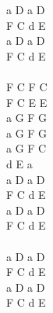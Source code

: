 \documentclass[a5paper, 10pt]{book}
\begin{document}
\begin{minipage}[t]{0.4\textwidth}
a D a D\\
F C d E\\
a D a D\\
F C d E\\
\\
F C F C\\
F C E E\\
a G F G\\
a G F G\\
a G F C\\
d E a\\

a D a D\\
F C d E\\
a D a D\\
F C d E\\

~\\

a D a D\\
F C d E\\
a D a D\\
F C d E\\

\end{minipage}

\newpage
\end{document}
